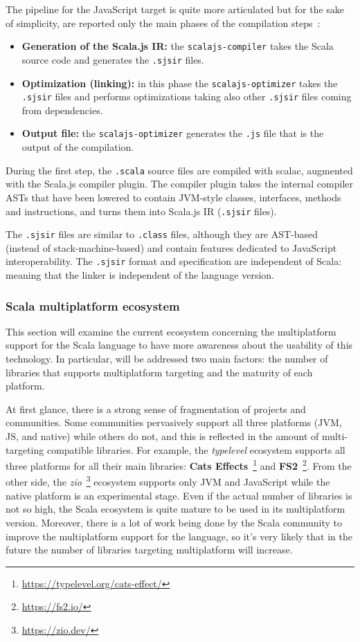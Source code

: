 The pipeline for the JavaScript target is quite more articulated but for the sake of simplicity, are reported only the main phases of the compilation
steps~\cite{Doeraene:256862}:
\begin{itemize}
	\item \textbf{Generation of the Scala.js IR:} the \texttt{scalajs-compiler} takes the Scala source code and generates the \texttt{.sjsir} files.
	\item \textbf{Optimization (linking):} in this phase the \texttt{scalajs-optimizer} takes the \texttt{.sjsir} files and performs optimizations
	      taking also other \texttt{.sjsir} files coming from dependencies.
	\item \textbf{Output file:} the \texttt{scalajs-optimizer} generates the \texttt{.js} file that is the output of the compilation.
\end{itemize}

During the first step, the \texttt{.scala} source files are compiled with scalac, augmented with the Scala.js compiler plugin.
The compiler plugin takes the internal compiler ASTs that have been lowered to contain JVM-style classes, interfaces, methods and instructions, and
turns them into Scala.js IR (\texttt{.sjsir} files).

The \texttt{.sjsir} files are similar to \texttt{.class} files, although they are AST-based (instead of stack-machine-based) and contain features
dedicated to JavaScript interoperability. The \texttt{.sjsir} format and specification are independent of Scala: meaning that the linker is
independent of the language version.

\subsubsection{Scala multiplatform ecosystem}

This section will examine the current ecosystem concerning the multiplatform support for the Scala language to have more awareness about the
usability of this technology.
In particular, will be addressed two main factors: the number of libraries that supports multiplatform targeting and the maturity of each platform.

At first glance, there is a strong sense of fragmentation of projects and communities. Some communities pervasively support all three
platforms (JVM, JS, and native) while others do not, and this is reflected in the amount of multi-targeting compatible libraries.
For example, the \emph{typelevel} ecosystem supports all three platforms for all their main libraries:
\textbf{Cats Effects}~\footnote{\url{https://typelevel.org/cats-effect/}} and \textbf{FS2}~\footnote{\url{https://fs2.io/}}.
From the other side, the \emph{zio}~\footnote{\url{https://zio.dev/}} ecosystem supports only JVM and JavaScript while the native platform is an
experimental stage.
Even if the actual number of libraries is not so high, the Scala ecosystem is quite mature to be used in its multiplatform version.
Moreover, there is a lot of work being done by the Scala community to improve the multiplatform support for the language, so it's very likely that in
the future the number of libraries targeting multiplatform will increase.


